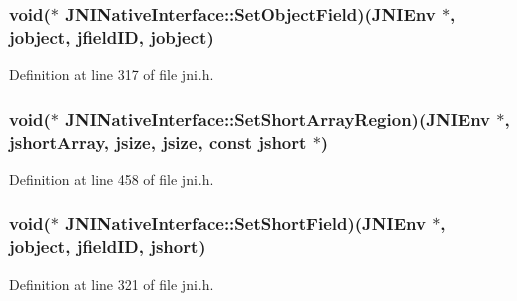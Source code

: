 \hypertarget{struct_j_n_i_native_interface_a20be8a4faad9c210c67d6010ac1f6310}{
\subsubsection[{Set\-Object\-Field}]{\setlength{\rightskip}{0pt plus 5cm}void($\ast$ J\-N\-I\-Native\-Interface\-::\-Set\-Object\-Field)({\bf J\-N\-I\-Env} $\ast$, {\bf jobject}, {\bf jfield\-I\-D}, {\bf jobject})}}\label{struct_j_n_i_native_interface_a20be8a4faad9c210c67d6010ac1f6310}


Definition at line 317 of file jni.\-h.

\hypertarget{struct_j_n_i_native_interface_a1ae03cff1fefca43dfd1cad078f2e6a0}{
\subsubsection[{Set\-Short\-Array\-Region}]{\setlength{\rightskip}{0pt plus 5cm}void($\ast$ J\-N\-I\-Native\-Interface\-::\-Set\-Short\-Array\-Region)({\bf J\-N\-I\-Env} $\ast$, {\bf jshort\-Array}, {\bf jsize}, {\bf jsize}, const {\bf jshort} $\ast$)}}\label{struct_j_n_i_native_interface_a1ae03cff1fefca43dfd1cad078f2e6a0}


Definition at line 458 of file jni.\-h.

\hypertarget{struct_j_n_i_native_interface_a9e6970b69e154b53005f8f3a229d68f2}{
\subsubsection[{Set\-Short\-Field}]{\setlength{\rightskip}{0pt plus 5cm}void($\ast$ J\-N\-I\-Native\-Interface\-::\-Set\-Short\-Field)({\bf J\-N\-I\-Env} $\ast$, {\bf jobject}, {\bf jfield\-I\-D}, {\bf jshort})}}\label{struct_j_n_i_native_interface_a9e6970b69e154b53005f8f3a229d68f2}


Definition at line 321 of file jni.\-h.

